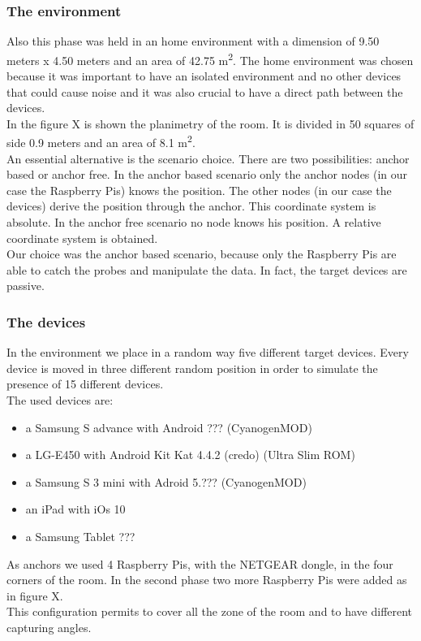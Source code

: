 \subsubsection{The environment}
Also this phase was held in an home environment with a dimension of 9.50 meters x 4.50 meters and an area of 42.75 m\textsuperscript{2}.
The home environment was chosen because it was important to have an isolated environment and no other devices that could cause noise and it was also crucial to have a direct path between the devices.\\
In the figure X is shown the planimetry of the room. It is divided in 50 squares of side 0.9 meters and an area of 8.1 m\textsuperscript{2}.\\
\linebreak
An essential alternative is the scenario choice. There are two possibilities: anchor based or anchor free. In the anchor based scenario only the anchor nodes (in our case the Raspberry Pis) knows the position. The other nodes (in our case the devices) derive the position through the anchor. This coordinate system is absolute. In the anchor free scenario no node knows his position. A relative coordinate system is obtained.\\
Our choice was the anchor based scenario, because only the Raspberry Pis are able to catch the probes and manipulate the data. In fact, the target devices are passive.
\subsubsection{The devices}
In the environment we place in a random way five different target devices. Every device is moved in three different random position in order to simulate the presence of 15 different devices.\\
The used devices are:
\begin{itemize}
\item a Samsung S advance with Android ??? (CyanogenMOD)
\item a LG-E450 with Android Kit Kat 4.4.2 (credo) (Ultra Slim ROM)
\item a Samsung S 3 mini with Adroid 5.??? (CyanogenMOD)
\item an iPad with iOs 10
\item a Samsung Tablet ???
\end{itemize}
As anchors we used 4 Raspberry Pis, with the NETGEAR dongle, in the four corners of the room. In the second phase two more Raspberry Pis were added as in figure X. \\
This configuration permits to cover all the zone of the room and to have different capturing angles.

